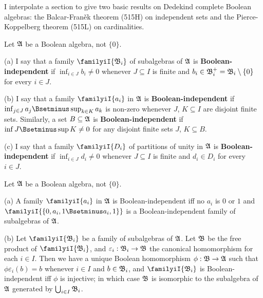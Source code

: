 
\def\chaptername{Cardinal functions}
\def\sectionname{The Balcar-Fran\v{e}k theorem}

\def\ind{\mathop{\text{ind}}}


I interpolate a section to give two basic results on Dedekind complete
Boolean algebras:  the Balcar-Fran\v{e}k theorem (515H) on independent
sets and the Pierce-Koppelberg theorem (515L) on cardinalities.

 Let $\frak A$ be a Boolean algebra, not
$\{0\}$.

(a) I say that a family $\familyiI{\frak B_i}$ of subalgebras of
$\frak A$ is {\bf Boolean-independent} if $\inf_{i\in J}b_i\ne 0$
whenever $J\subseteq I$ is finite and
$b_i\in\frak B_i^+=\frak B_i\setminus\{0\}$ for every $i\in J$.

(b) I say that a family $\familyiI{a_i}$ in $\frak A$ is
{\bf Boolean-independent} if
$\inf_{j\in J}a_j\Bsetminus\sup_{k\in K}a_k$ is non-zero whenever $J$,
$K\subseteq I$ are disjoint finite sets.   Similarly, a set
$B\subseteq\frak A$ is {\bf Boolean-independent} if
$\inf J\Bsetminus\sup K\ne 0$ for any disjoint finite sets $J$,
$K\subseteq B$.

(c) I say that a family $\familyiI{D_i}$ of partitions of unity in
$\frak A$ is {\bf Boolean-independent} if $\inf_{i\in J}d_i\ne 0$
whenever $J\subseteq I$ is finite and $d_i\in D_i$ for every $i\in J$.


 Let $\frak A$ be a Boolean
algebra, not $\{0\}$.

(a) A family $\familyiI{a_i}$ in $\frak A$ is Boolean-independent iff no
$a_i$ is $0$ or $1$ and $\familyiI{\{0,a_i,1\Bsetminus a_i,1\}}$ is a
Boolean-independent family of subalgebras of $\frak A$.

(b) Let $\familyiI{\frak B_i}$ be a family of subalgebras of $\frak A$.
Let $\frak B$ be the free product of $\familyiI{\frak B_i}$, and
$\varepsilon_i:\frak B_i\to\frak B$ the canonical homomorphism for each
$i\in I$.   Then we have a unique Boolean homomorphism
$\phi:\frak B\to\frak A$ such that $\phi\varepsilon_i(b)=b$ whenever
$i\in I$ and $b\in\frak B_i$, and $\familyiI{\frak B_i}$ is
Boolean-independent iff $\phi$ is injective;  in which case $\frak B$ is
isomorphic to the subalgebra of $\frak A$ generated by
$\bigcup_{i\in I}\frak B_i$.

